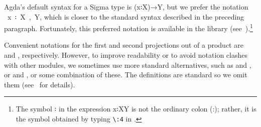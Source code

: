 Agda's default syntax for a Sigma type is (\ab x꞉\ab X)\as →\ab Y, but we prefer the notation ~\ab x~꞉~\ab X~,~\ab Y, which is closer to the standard syntax described in the preceding paragraph. Fortunately, this preferred notation is available in the \typetopology library (see~\cite[Σ types]{MHE}).\footnote{The symbol \as ꞉ in the expression \ab x\as ꞉\ab X\AgdaComma{}\ab Y is not the ordinary colon (:); rather, it is the symbol obtained by typing \texttt{\textbackslash{}:4} in \agdatwomode.} 

\newcommand\FstUnder{\AgdaOperator{\AgdaFunction{∣\AgdaUnderscore{}∣}}\xspace}
\newcommand\SndUnder{\AgdaOperator{\AgdaFunction{∥\AgdaUnderscore{}∥}}\xspace}
Convenient notations for the first and second projections out of a product are \FstUnder and \SndUnder, respectively. However, to improve readability or to avoid notation clashes with other modules, we sometimes use more standard alternatives, such as  and , or  and , or some combination of these. The definitions are standard so we omit them (see~\cite{DeMeo:2021} for details).






